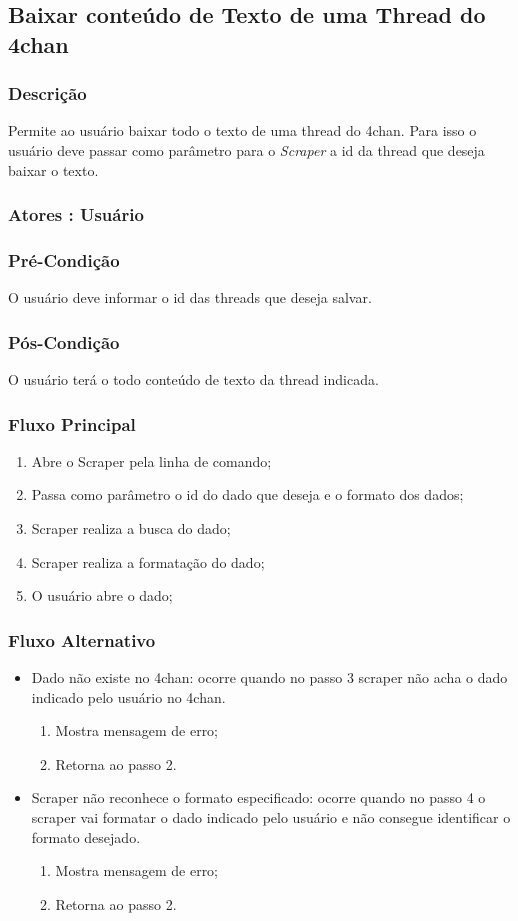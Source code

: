 \subsection{Baixar conteúdo de Texto de uma Thread do 4chan}
\subsubsection{Descrição}
Permite ao usuário baixar todo o texto de uma thread do 4chan. Para isso o usuário deve passar como parâmetro para o \textit{Scraper} a id da thread que deseja baixar o texto.
\subsubsection{Atores : Usuário}
\subsubsection{Pré-Condição}
O usuário deve informar o id das threads que deseja salvar.
\subsubsection{Pós-Condição}
O usuário terá o todo conteúdo de texto da thread indicada.
\subsubsection{Fluxo Principal}
\begin{enumerate}
    \item Abre o Scraper pela linha de comando;
    \item Passa como parâmetro o id do dado que deseja e o formato dos dados;
    \item Scraper realiza a busca do dado;
    \item Scraper realiza a formatação do dado;
    \item O usuário abre o dado;
\end{enumerate}
\subsubsection{Fluxo Alternativo}
\begin{itemize}
    \item Dado não existe no 4chan: ocorre quando no passo 3 scraper não acha o dado indicado pelo usuário no 4chan.
    \begin{enumerate}
        \item Mostra mensagem de erro;
        \item Retorna ao passo 2.
    \end{enumerate}
    \item Scraper não reconhece o formato especificado: ocorre quando no passo 4 o scraper vai formatar o dado indicado pelo usuário e não consegue identificar o formato desejado.
    \begin{enumerate}
        \item Mostra mensagem de erro;
        \item Retorna ao passo 2.
    \end{enumerate}
\end{itemize}

